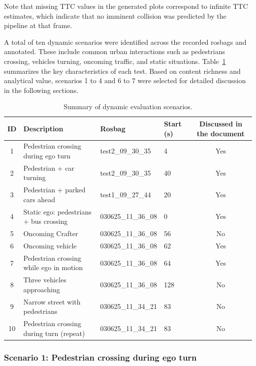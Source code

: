 Note that missing TTC values in the generated plots correspond to infinite 
TTC estimates, which indicate that no imminent collision was predicted by 
the pipeline at that frame.

A total of ten dynamic scenarios were identified across the recorded rosbags and annotated. These 
include common urban interactions such as pedestrians crossing, vehicles 
turning, oncoming traffic, and static situations. 
Table~\ref{tab:scenario_summary} summarizes the key characteristics of 
each test. Based on content richness and analytical value, scenarios 1 to 4 
and 6 to 7 were selected for detailed discussion in the following sections.
\begin{table}[H]
  \centering
  \begin{tabularx}{\textwidth}{c X l l c}
    \toprule
    \textbf{ID} & \textbf{Description} & \textbf{Rosbag} & \textbf{Start (s)} & \textbf{Discussed in the document} \\
    \midrule
    1 & Pedestrian crossing during ego turn       & test2\_09\_30\_35 & 4   & Yes \\
    2 & Pedestrian + car turning                  & test2\_09\_30\_35 & 40  & Yes \\
    3 & Pedestrian + parked cars ahead            & test1\_09\_27\_44 & 20  & Yes \\
    4 & Static ego: pedestrians + bus crossing    & 030625\_11\_36\_08 & 0  & Yes \\
    5 & Oncoming Crafter                          & 030625\_11\_36\_08 & 56  & No \\
    6 & Oncoming vehicle                          & 030625\_11\_36\_08 & 62  & Yes \\
    7 & Pedestrian crossing while ego in motion   & 030625\_11\_36\_08 & 64  & Yes \\
    8 & Three vehicles approaching                & 030625\_11\_36\_08 & 128 & No \\
    9 & Narrow street with pedestrians            & 030625\_11\_34\_21 & 83  & No \\
    10 & Pedestrian crossing during turn (repeat) & 030625\_11\_34\_21 & 83  & No \\
    \bottomrule
  \end{tabularx}
  \caption{Summary of dynamic evaluation scenarios.}
  \label{tab:scenario_summary}
\end{table}


\subsubsection{Scenario 1: Pedestrian crossing during ego turn}

